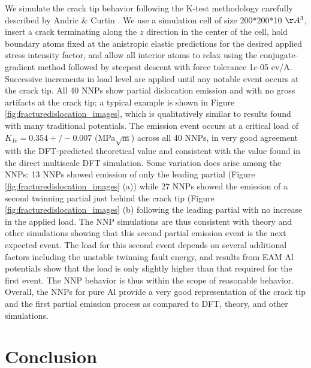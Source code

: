 \documentclass{article}
\begin{document}
We simulate the crack tip behavior following the K-test methodology carefully described by Andric \& Curtin \cite{Andric2019AtomisticFracture}.  We use a simulation cell of size 200*200*10 $\AA^3$, insert a crack terminating along the $z$ direction in the center of the cell, hold boundary atoms fixed at the anistropic elastic predictions for the desired applied stress intensity factor, and allow all interior atoms to relax using the conjugate-gradient method followed by steepest descent with force tolerance 1$e$-05 ev/A.  Successive increments in load level are applied until any notable event occurs at the crack tip.
All 40 NNPs show partial dislocation emission and with no gross artifacts at the crack tip; a typical example is shown in Figure \ref{fig:fracturedislocation_images}, which is qualitatively similar to results found with many traditional potentials.  The emission event occurs at a critical load of $K_{Ie}=0.354+/-0.007$ (MPa$\sqrt{\text{m}}$) across all 40 NNPs, in very good agreement with the DFT-predicted theoretical value and consistent with the value found in the direct multiscale DFT simulation.  Some variation does arise among the NNPs: 13 NNPs showed emission of only the leading partial (Figure \ref{fig:fracturedislocation_images} (a)) while 27 NNPs showed the emission of a second twinning partial just behind the crack tip (Figure \ref{fig:fracturedislocation_images} (b) following the leading partial with no increase in the applied load.  The NNP simulations are thus consistent with theory and other simulations showing that this second partial emission event is the next expected event.  The load for this second event depends on several additional factors including the unstable twinning fault energy, and results from EAM Al potentials show that the load is only slightly higher than that required for the first event.  The NNP behavior is thus within the scope of reasonable behavior.  Overall, the NNPs for pure Al provide a very good representation of the crack tip and the first partial emission process as compared to DFT, theory, and other simulations.


\section{Conclusion}
\end{document}
